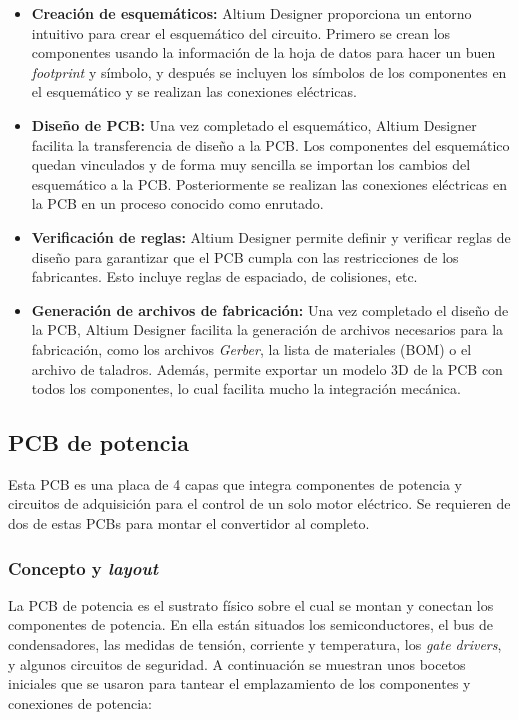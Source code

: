 \begin{itemize}
	\item \textbf{Creación de esquemáticos:} Altium Designer proporciona un entorno intuitivo para crear el esquemático del circuito. Primero se crean los componentes usando la información de la hoja de datos para hacer un buen \textit{footprint} y símbolo, y después se incluyen los símbolos de los componentes en el esquemático y se realizan las conexiones eléctricas.
	\item \textbf{Diseño de PCB:} Una vez completado el esquemático, Altium Designer facilita la transferencia de diseño a la PCB. Los componentes del esquemático quedan vinculados y de forma muy sencilla se importan los cambios del esquemático a la PCB. Posteriormente se realizan las conexiones eléctricas en la PCB en un proceso conocido como enrutado.
	
	\item \textbf{Verificación de reglas:} Altium Designer permite definir y verificar reglas de diseño para garantizar que el PCB cumpla con las restricciones de los fabricantes. Esto incluye reglas de espaciado, de colisiones, etc.
	
	\item \textbf{Generación de archivos de fabricación:} Una vez completado el diseño de la PCB, Altium Designer facilita la generación de archivos necesarios para la fabricación, como los archivos \textit{Gerber}, la lista de materiales (BOM) o el archivo de taladros. Además, permite exportar un modelo 3D de la PCB con todos los componentes, lo cual facilita mucho la integración mecánica.
	
\end{itemize}

\subsection{PCB de potencia}

Esta PCB es una placa de 4 capas que integra componentes de potencia y circuitos de adquisición para el control de un solo motor eléctrico. Se requieren de dos de estas PCBs para montar el convertidor al completo.

\subsubsection{Concepto y \textit{layout}}

La PCB de potencia es el sustrato físico sobre el cual se montan y conectan los componentes de potencia. En ella están situados los semiconductores, el bus de condensadores, las medidas de tensión, corriente y temperatura, los \textit{gate drivers}, y algunos circuitos de seguridad. A continuación se muestran unos bocetos iniciales que se usaron para tantear el emplazamiento de los componentes y conexiones de potencia:


